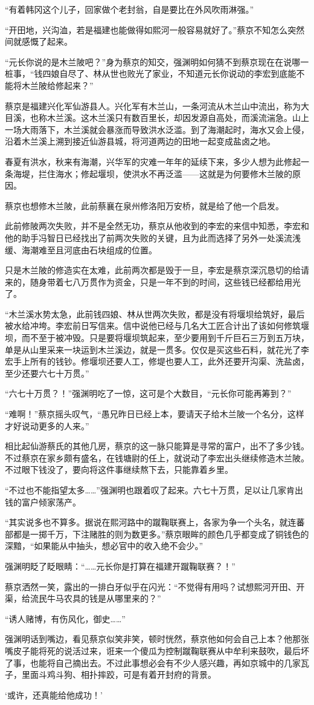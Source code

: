 “有着韩冈这个儿子，回家做个老封翁，自是要比在外风吹雨淋强。”

“开田地，兴沟洫，若是福建也能做得如熙河一般容易就好了。”蔡京不知怎么突然间就感慨了起来。

“元长你说的是木兰陂吧？”身为蔡京的知交，强渊明如何猜不到蔡京现在在说哪一桩事，“钱四娘自尽了、林从世也败光了家业，不知道元长你说动的李宏到底能不能将木兰陂给修起来？”

蔡京是福建兴化军仙游县人。兴化军有木兰山，一条河流从木兰山中流出，称为大目溪，也称木兰溪。这木兰溪只有数百里长，却因发源自高处，而溪流湍急。山上一场大雨落下，木兰溪就会暴涨而导致洪水泛滥。到了海潮起时，海水又会上侵，沿着木兰溪上溯到接近仙游县城，将河道两边的田地一起变成盐卤之地。

春夏有洪水，秋来有海潮，兴华军的灾难一年年的延续下来，多少人想为此修起一条海堤，拦住海水；修起堰坝，使洪水不再泛滥——这就是为何要修木兰陂的原因。

蔡京也想修木兰陂，此前蔡襄在泉州修洛阳万安桥，就是给了他一个启发。

此前修陂两次失败，并不是全然无功，蔡京从他收到的李宏的来信中知悉，李宏和他的助手冯智日已经找出了前两次失败的关键，且为此而选择了另外一处溪流浅缓、海潮难至且河底由石块组成的位置。

只是木兰陂的修造实在太难，此前两次都是毁于一旦，李宏是蔡京深沉恳切的给请来的，随身带着七八万贯作为资金，只是一年不到的时间，这些钱已经都给用光了。

“木兰溪水势太急，此前钱四娘、林从世两次失败，都是没有将堰坝给筑好，最后被水给冲垮。李宏前日写信来。信中说他已经与几名大工匠合计出了该如何修筑堰坝，而不至于被冲毁。只是要将堰坝筑起来，至少要用到千斤巨石三万到五万块，单是从山里采来一块运到木兰溪边，就是一贯多。仅仅是买这些石料，就花光了李宏手上所有的钱钞。修堰坝还要人工，修堤也要人工，此外还要开沟渠、洗盐卤，至少还要六七十万贯。”

“六七十万贯？！”强渊明吃了一惊，这可是个大数目，“元长你可能再筹到？”

“难啊！”蔡京摇头叹气，“愚兄昨日已经上本，要请天子给木兰陂一个名分，这样才好说动更多的人来。”

相比起仙游蔡氏的其他几房，蔡京的这一脉只能算是寻常的富户，出不了多少钱。不过蔡京在家乡颇有盛名，在钱塘尉的任上，就说动了李宏出头继续修造木兰陂。不过眼下钱没了，要向将这件事继续熬下去，只能靠着乡里。

“不过也不能指望太多……”强渊明也跟着叹了起来。六七十万贯，足以让几家肯出钱的富户倾家荡产。

“其实说多也不算多。据说在熙河路中的蹴鞠联赛上，各家为争一个头名，就连蕃部都是一掷千万，下注赌胜的则为数更多。”蔡京眼眸的颜色几乎都变成了铜钱色的深黯，“如果能从中抽头，想必官中的收入绝不会少。”

强渊明眨了眨眼睛：“……元长你是打算在福建开蹴鞠联赛？！”

蔡京洒然一笑，露出的一排白牙似乎在闪光：“不觉得有用吗？试想熙河开田、开渠，给流民牛马农具的钱是从哪里来的？”

“诱人赌博，有伤风化，御史……”

强渊明话到嘴边，看见蔡京似笑非笑，顿时恍然，蔡京他如何会自己上本？他那张嘴皮子能将死的说活过来，诳来一个傻瓜为控制蹴鞠联赛从中牟利来鼓吹，最后坏了事，也能将自己摘出去。不过此事想必会有不少人感兴趣，再如京城中的几家瓦子，里面斗鸡斗狗、相扑摔跤，可是有着开封府的背景。

‘或许，还真能给他成功！’

